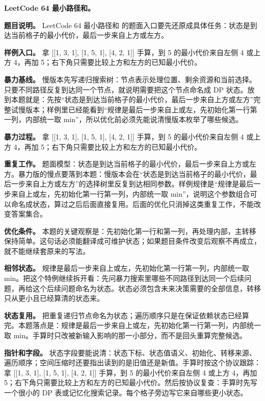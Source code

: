 \noindent\textbf{LeetCode 64 最小路径和。}

\textbf{题目说明。} LeetCode 64 最小路径和 的题面入口要先还原成具体任务：状态是到达当前格子的最小代价，最后一步来自上方或左方。

\textbf{样例入口。} 拿 [[1, 3, 1], [1, 5, 1], [4, 2, 1]] 手算，到 5 的最小代价来自左侧 4 或上方 4，再加 5；右下角只需要比较上方和左方的已知最小代价。

\textbf{暴力基线。} 慢版本先写递归搜索树：节点表示处理位置、剩余资源和当前选择。只要不同路径反复到达同一个节点，就说明需要把这个节点命名成 DP 状态。放到本题就是：先按“状态是到达当前格子的最小代价，最后一步来自上方或左方”完整试慢版本；样例里已经能看到“规律是最后一步来自上或左，先初始化第一行第一列，内部统一取 min”，所以优化前必须先能说清慢版本枚举了哪些候选。

\textbf{暴力过程。} 拿 [[1, 3, 1], [1, 5, 1], [4, 2, 1]] 手算，到 5 的最小代价来自左侧 4 或上方 4，再加 5；右下角只需要比较上方和左方的已知最小代价。

\textbf{重复工作。} 题面模型：状态是到达当前格子的最小代价，最后一步来自上方或左方。暴力版的慢点要落到本题：慢版本会在“状态是到达当前格子的最小代价，最后一步来自上方或左方”的选择树里反复到达相同参数。样例规律是“规律是最后一步来自上或左，先初始化第一行第一列，内部统一取 min”，说明这个参数组合可以命名成状态，算过之后后面直接复用。后面的优化只消掉这类重复工作，不能改变答案集合。

\textbf{优化条件。} 本题的关键观察是：先初始化第一行和第一列，再处理内部，主转移保持简单。这句话必须能翻译成可维护状态；如果题目条件改变后观察不再成立，就不能继续套原来的写法。

\textbf{相邻状态。} 规律是最后一步来自上或左，先初始化第一行第一列，内部统一取 min。把这个特例继续拆开看：先问暴力搜索里哪些不同路径到达同一个后续问题，再给这个后续问题命名为状态。状态必须包含未来决策需要的全部信息，转移只从更小且已经算清的状态来。

\textbf{状态复用。} 把重复递归节点命名为状态；遍历顺序只是在保证依赖状态已经算完。本题落点是：规律是最后一步来自上或左，先初始化第一行第一列，内部统一取 min。手算时只改被新输入影响的那一小部分，而不是回头重算完整候选。

\textbf{指针和字段。} 状态字段要能说清：状态下标、状态值语义、初始化、转移来源、遍历顺序；空间压缩时还要指出读到的是旧值还是新值。手算时按这个协议跟踪：拿 [[1, 3, 1], [1, 5, 1], [4, 2, 1]] 手算，到 5 的最小代价来自左侧 4 或上方 4，再加 5；右下角只需要比较上方和左方的已知最小代价。然后按协议复查：手算时先写一个很小的 DP 表或记忆化搜索记录。每个格子旁边写它来自哪些更小状态。

